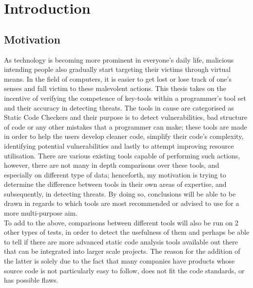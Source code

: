 
\chapter{Introduction}\label{cap:intro}


\section{Motivation}\label{sect:motivation}

As technology is becoming more prominent in everyone's daily life, malicious intending people also gradually start targeting their victims through virtual means. In the field of computers, it is easier to get lost or lose track of one's senses and fall victim to these malevolent actions. This thesis takes on the incentive of verifying the competence of key-tools within a programmer's tool set and their accuracy in detecting threats. The tools in cause are categorised as Static Code Checkers and their purpose is to detect vulnerabilities, bad structure of code or any other mistakes that a programmer can make; these tools are made in order to help the users develop cleaner code, simplify their code's complexity, identifying potential vulnerabilities and lastly to attempt improving resource utilisation. There are various existing tools capable of performing such actions, however, there are not many in depth comparisons over these tools, and especially on different type of data; henceforth, my motivation is trying to determine the difference between tools in their own areas of expertise, and subsequently, in detecting threats. By doing so, conclusions will be able to be drawn in regards to which tools are most recommended or advised to use for a more multi-purpose aim.\\

\noindent To add to the above, comparisons between different tools will also be run on 2 other types of tests, in order to detect the usefulness of them and perhaps be able to tell if there are more advanced static code analysis tools available out there that can be integrated into larger scale projects. The reason for the addition of the latter is solely due to the fact that many companies have products whose source code is not particularly easy to follow, does not fit the code standards, or has possible flaws. 